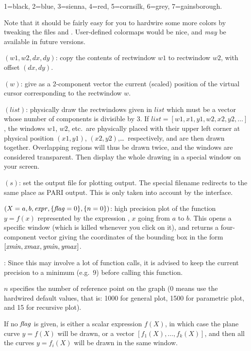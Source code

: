 1=black, 2=blue, 3=sienna, 4=red, 5=cornsilk, 6=grey, 7=gainsborough.

Note that it should be fairly easy for you to hardwire some more colors by
tweaking the files  and . User-defined
colormaps would be nice, and \emph{may} be available in future versions.

$(w1,w2,dx,dy)$: copy the contents of rectwindow
$w1$ to rectwindow $w2$, with offset $(dx,dy)$.

$(w)$: give as a 2-component vector the current
(scaled) position of the virtual cursor corresponding to the rectwindow $w$.

$(list)$: physically draw the rectwindows given in $list$
which must be a vector whose number of components is divisible by 3. If
$list=[w1,x1,y1,w2,x2,y2,\dots]$, the windows $w1$, $w2$, etc.~are
physically placed with their upper left corner at physical position
$(x1,y1)$, $(x2,y2)$,\dots\ respectively, and are then drawn together.
Overlapping regions will thus be drawn twice, and the windows are considered
transparent. Then display the whole drawing in a special window on your
screen.

$(s)$: set the output file for plotting output. The
special filename  redirects to the same place as PARI output. This
is only taken into account by the  interface.

$(X=a,b,\hbox{\it expr\/},\{\hbox{\it f\kern0pt lag\/}=0\},\{n=0\})$: high precision
plot of the function $y=f(x)$ represented by the expression , $x$
going from $a$ to $b$. This opens a specific window (which is killed
whenever you click on it), and returns a four-component vector giving the
coordinates of the bounding box in the form
$[\hbox{\it xmin\/},\hbox{\it xmax\/},\hbox{\it ymin\/},\hbox{\it ymax\/}]$.

: Since this may involve a lot of function calls,
it is advised to keep the current precision to a minimum (e.g.~9) before
calling this function.

$n$ specifies the number of reference point on the graph (0 means use the
hardwired default values, that is: 1000 for general plot, 1500 for
parametric plot, and 15 for recursive plot).

If no $\hbox{\it f\kern0pt lag\/}$ is given,  is either a scalar expression $f(X)$, in which
case the plane curve $y=f(X)$ will be drawn, or a vector
$[f_1(X),\dots,f_k(X)]$, and then all the curves $y=f_i(X)$ will be drawn in
the same window.

